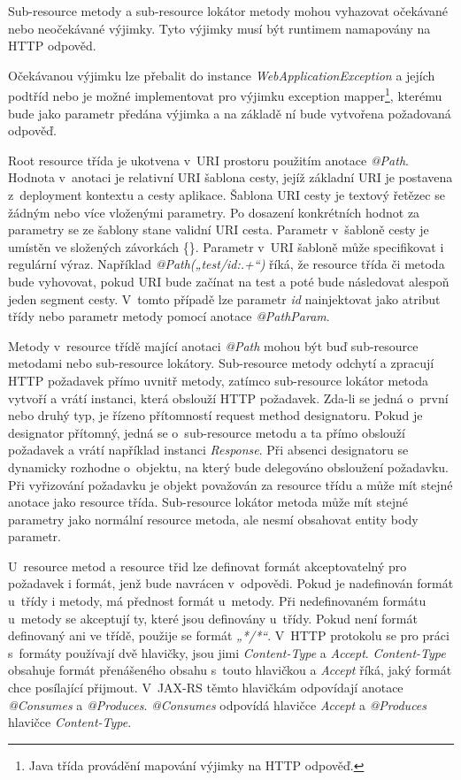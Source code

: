 \documentclass[11pt,twoside,a4paper]{book}
\begin{document}
Sub-resource metody a sub-resource lokátor metody mohou vyhazovat očekávané
nebo neočekávané výjimky. Tyto výjimky musí být runtimem namapovány na HTTP odpověd.

Očekávanou výjimku lze přebalit do instance {\em WebApplicationException} a
jejích podtříd nebo je možné implementovat pro výjimku exception
mapper\footnote{Java třída provádění mapování výjimky na HTTP odpověď.}, kterému
bude jako parametr předána výjimka a na základě ní bude vytvořena požadovaná
odpověď.

Root resource třída je ukotvena v~URI prostoru použitím anotace {\em @Path}.
Hodnota v~anotaci je relativní URI šablona cesty, jejíž základní URI je postavena z~deployment kontextu a cesty
aplikace. Šablona URI cesty je textový řetězec se žádným nebo více vloženými
parametry. Po dosazení konkrétních hodnot za parametry se ze šablony stane validní URI cesta. Parametr
v~šabloně cesty je umístěn ve složených závorkách \{\}. Parametr v~URI šabloně
může specifikovat i regulární výraz. Například {\em @Path(„test/{id:.+}“)} říká,
že resource třída či metoda bude vyhovovat, pokud URI bude začínat na test a poté bude následovat alespoň jeden
segment cesty. V~tomto případě lze parametr {\em id} nainjektovat jako atribut
třídy nebo parametr metody pomocí anotace {\em @PathParam}.

Metody v~resource třídě mající anotaci {\em @Path} mohou být buď sub-resource
metodami nebo sub-resource lokátory. Sub-resource metody odchytí a zpracují HTTP požadavek přímo uvnitř
metody, zatímco sub-resource lokátor metoda vytvoří a vrátí instanci, která obslouží HTTP
požadavek. Zda-li se jedná o~první nebo druhý typ, je řízeno přítomností request method
designatoru. Pokud je designator přítomný, jedná se o~sub-resource metodu a ta přímo
obslouží požadavek a vrátí například instanci {\em Response}. Při absenci designatoru se dynamicky
rozhodne o~objektu, na který bude delegováno obsloužení požadavku. Při vyřizování
požadavku je objekt považován za resource třídu a může mít stejné anotace jako resource
třída. Sub-resource lokátor metoda může mít stejné parametry jako normální resource metoda,
ale nesmí obsahovat entity body parametr.

U~resource metod a resource třid lze definovat formát akceptovatelný pro
požadavek i formát, jenž bude navrácen v~odpovědi. Pokud je nadefinován formát
u~třídy i metody, má přednost formát u~metody. Při nedefinovaném formátu
u~metody se akceptují ty, které jsou definovány u~třídy. Pokud není formát
definovaný ani ve třídě, použije se formát {\em „*/*“}. V~HTTP protokolu se pro
práci s~formáty používají dvě hlavičky, jsou jimi {\em Content-Type} a {\em
Accept}.
{\em Content-Type} obsahuje formát přenášeného obsahu s~touto hlavičkou a {\em
Accept} říká, jaký formát chce posílající přijmout. V~JAX-RS těmto hlavičkám
odpovídají anotace {\em @Consumes} a {\em @Produces}. {\em @Consumes} odpovídá
hlavičce {\em Accept} a {\em @Produces} hlavičce {\em Content-Type}.
\end{document}
